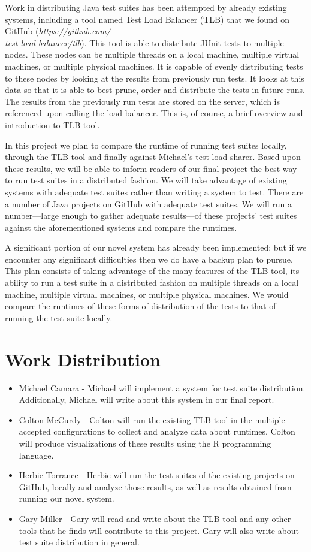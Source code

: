 \documentclass[12pt]{article}
\begin{document}
Work in distributing Java test suites has been attempted by already existing systems, including a tool
named Test Load Balancer (TLB) that we found on GitHub (\textit{https://github.com/\\test-load-balancer/tlb}).
This tool is able to distribute JUnit tests to multiple nodes. These nodes
can be multiple threads on a local machine, multiple virtual machines, or
multiple physical machines. It is capable of evenly distributing tests
to these nodes by looking at the results from previously run tests. It looks
at this data so that it is able to best prune, order and distribute the tests
in future runs. The results from the previously run tests are stored
on the server, which is referenced upon calling the load balancer. This is, of
course, a brief overview and introduction to TLB tool.

In this project we plan to compare the runtime of running test suites locally,
through the TLB tool and finally against Michael's test load sharer. Based upon
these results, we will be able to inform readers of our final project the
best way to run test suites in a distributed fashion.  We will take advantage 
of existing systems with adequate test suites rather
than writing a system to test. There are a number of Java projects on GitHub
with adequate test suites. We will run a number---large enough to gather
adequate results---of these projects' test suites against the aforementioned
systems and compare the runtimes.

A significant portion of our novel system has already been implemented; but if we encounter any significant 
difficulties then we do have a backup plan to pursue. This plan consists of taking advantage of the many features of the TLB
tool, its ability to run a test suite in a distributed fashion on multiple
threads on a local machine, multiple virtual machines, or multiple physical
machines. We would compare the runtimes of these forms of distribution of the tests
to that of running the test suite locally.


\section{Work Distribution}

\begin{itemize}
\item Michael Camara - Michael will implement a system for test suite distribution. Additionally,
Michael will write about this system in our final report.
\item Colton McCurdy - Colton will run the existing TLB tool in the multiple accepted configurations to collect
and analyze data about runtimes. Colton will produce visualizations of these
results using the R programming language.
\item Herbie Torrance - Herbie will run the test suites of the existing projects
on GitHub, locally and analyze those results, as well as results obtained from running our novel system.
\item Gary Miller - Gary will read and write about the TLB tool and any
other tools that he finds will contribute to this project. Gary will also
write about test suite distribution in general.
\end{itemize}
\end{document}
